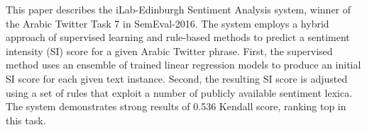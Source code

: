 This paper describes the iLab-Edinburgh Sentiment Analysis system, winner of the Arabic Twitter Task 7 in SemEval-2016. The system employs a hybrid approach of supervised learning and rule-based methods to predict a sentiment intensity (SI) score for a given Arabic Twitter phrase. First, the supervised method uses an ensemble of trained linear regression models to produce an initial SI score for each given text instance. Second, the resulting SI score is adjusted using a set of rules that exploit a number of publicly available sentiment lexica. The system demonstrates strong results of 0.536 Kendall score, ranking top in this task.
